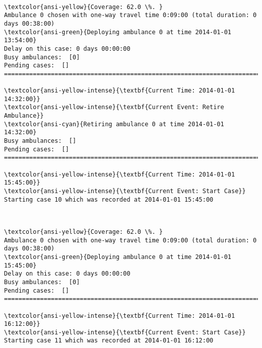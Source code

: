 \documentclass[11pt]{article}
\begin{document}
    \begin{center}
    \end{center}
    { \hspace*{\fill} \\}
    
    \begin{Verbatim}[commandchars=\\\{\}]
\textcolor{ansi-yellow}{Coverage: 62.0 \%. }
Ambulance 0 chosen with one-way travel time 0:09:00 (total duration: 0 days 00:38:00)
\textcolor{ansi-green}{Deploying ambulance 0 at time 2014-01-01 13:54:00}
Delay on this case: 0 days 00:00:00
Busy ambulances:  [0]
Pending cases:  []
========================================================================

\textcolor{ansi-yellow-intense}{\textbf{Current Time: 2014-01-01 14:32:00}}
\textcolor{ansi-yellow-intense}{\textbf{Current Event: Retire Ambulance}}
\textcolor{ansi-cyan}{Retiring ambulance 0 at time 2014-01-01 14:32:00}
Busy ambulances:  []
Pending cases:  []
========================================================================

\textcolor{ansi-yellow-intense}{\textbf{Current Time: 2014-01-01 15:45:00}}
\textcolor{ansi-yellow-intense}{\textbf{Current Event: Start Case}}
Starting case 10 which was recorded at 2014-01-01 15:45:00

    \end{Verbatim}

    \begin{center}
    \end{center}
    { \hspace*{\fill} \\}
    
    \begin{Verbatim}[commandchars=\\\{\}]
\textcolor{ansi-yellow}{Coverage: 62.0 \%. }
Ambulance 0 chosen with one-way travel time 0:09:00 (total duration: 0 days 00:38:00)
\textcolor{ansi-green}{Deploying ambulance 0 at time 2014-01-01 15:45:00}
Delay on this case: 0 days 00:00:00
Busy ambulances:  [0]
Pending cases:  []
========================================================================

\textcolor{ansi-yellow-intense}{\textbf{Current Time: 2014-01-01 16:12:00}}
\textcolor{ansi-yellow-intense}{\textbf{Current Event: Start Case}}
Starting case 11 which was recorded at 2014-01-01 16:12:00

    \end{Verbatim}
\end{document}
